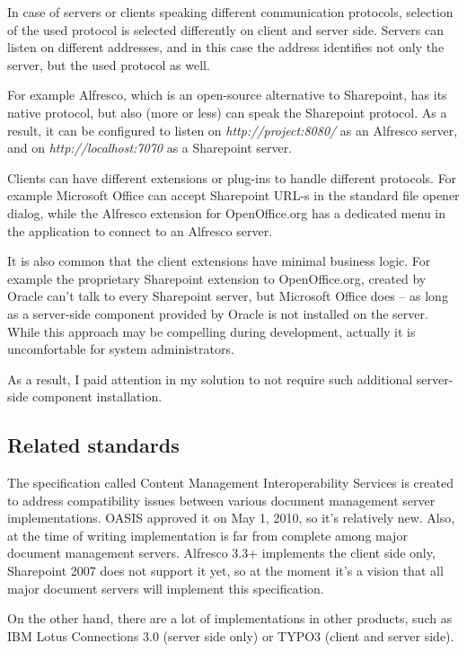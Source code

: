 In case of servers or clients speaking different communication protocols,
selection of the used protocol is selected differently on client and server
side. Servers can listen on different addresses, and in this case the address
identifies not only the server, but the used protocol as well.

For example Alfresco\cite{alfresco}, which is an open-source alternative to
Sharepoint, has its native protocol, but also (more or less) can speak the
Sharepoint protocol. As a result, it can be configured to listen on
\emph{http://project:8080/} as an Alfresco server, and on
\emph{http://localhost:7070} as a Sharepoint server.

Clients can have different extensions or plug-ins to handle different
protocols. For example Microsoft Office can accept Sharepoint URL-s in the
standard file opener dialog, while the Alfresco extension for OpenOffice.org
has a dedicated menu in the application to connect to an Alfresco server.

It is also common that the client extensions have minimal business logic. For
example the proprietary Sharepoint extension to OpenOffice.org, created by
Oracle can't talk to every Sharepoint server, but Microsoft Office does -- as
long as a server-side component provided by Oracle is not installed on the
server. While this approach may be compelling during development, actually it
is uncomfortable for system administrators.

As a result, I paid attention in my solution to not require such additional
server-side component installation.

\subsection{Related standards}

The specification called Content Management Interoperability
Services\cite{cmis} is created to address compatibility issues between various
document management server implementations. OASIS approved it on May 1, 2010,
so it's relatively new. Also, at the time of writing implementation is far from
complete among major document management servers. Alfresco 3.3+ implements the
client side only, Sharepoint 2007 does not support it yet, so at the moment
it's a vision that all major document servers will implement this
specification.

On the other hand, there are a lot of implementations in other products, such
as IBM Lotus Connections 3.0\cite{lotus} (server side only) or TYPO3 (client
and server side).

